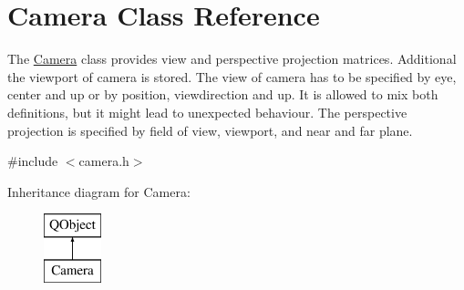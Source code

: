 \hypertarget{class_camera}{}\section{Camera Class Reference}
\label{class_camera}


The \hyperlink{class_camera}{Camera} class provides view and perspective projection matrices. Additional the viewport of camera is stored.  The view of camera has to be specified by eye, center and up or by position, viewdirection and up. It is allowed to mix both definitions, but it might lead to unexpected behaviour. The perspective projection is specified by field of view, viewport, and near and far plane.  




{\ttfamily \#include $<$camera.\+h$>$}

Inheritance diagram for Camera\+:\begin{figure}[H]
\begin{center}
\leavevmode
\includegraphics[height=2.000000cm]{class_camera}
\end{center}
\end{figure}
